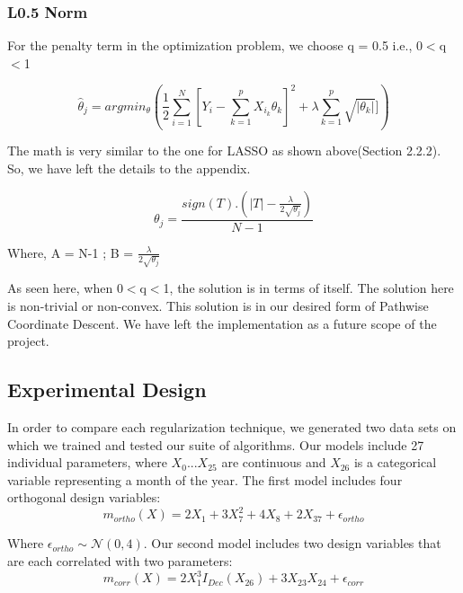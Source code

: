 \documentclass[11pt]{article}
\begin{document}
\subsubsection{L0.5 Norm} 

For the penalty term in the optimization problem, we choose q = 0.5 i.e., 0$<$q$<$1

\begin{equation}
    \hat{\theta}_j = argmin_{\theta} {( \frac{1}{2}  \sum_{i=1}^{N}[Y_i - \sum_{k=1}^{p} X_{i_k}\theta_k]^2  + \lambda \sum_{k=1}^p \sqrt{|\theta_k|}])}
\end{equation}



The math is very similar to the one for LASSO as shown above(Section 2.2.2). So, we have left the details to the appendix. 

\begin{equation}
        \theta_j = \frac{sign(T).(|T| - \frac{\lambda}{2\sqrt{\theta_j}})}{N-1}
\end{equation}

Where, 
A = N-1 ; B = $\frac{\lambda}{2\sqrt{\theta_j}}$

As seen here, when 0$<$q$<$1, the solution is in terms of itself. The solution here is non-trivial or non-convex. This solution is in our desired form of Pathwise Coordinate Descent. We have left the implementation as a future scope of the project.


\subsection{Experimental Design}
In order to compare each regularization technique, we generated two data sets on which we trained and tested our suite of algorithms.  Our models include 27 individual parameters, where $X_0 ... X_{25}$ are continuous and $X_{26}$ is a categorical variable representing a month of the year.  The first model includes four orthogonal design variables:
	$$m_{ortho}(X) = 2X_1 + 3X_7^2 + 4X_8 + 2X_{37} + \epsilon_{ortho}$$

Where $\epsilon_{ortho} \sim \mathcal{N}(0,4)$.  Our second model includes two design variables that are each correlated with two parameters:
	$$m_{corr}(X) = 2X_1^3I_{Dec}(X_{26}) + 3X_{23}X_{24} + \epsilon_{corr}$$
\end{document}
